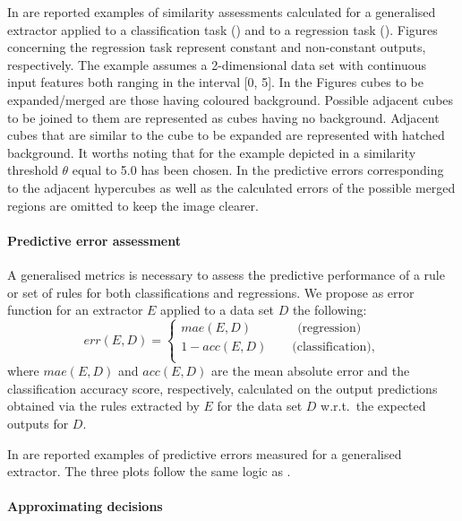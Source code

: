 \documentclass[
]{ceurart}
\begin{document}
In  are reported examples of similarity assessments calculated for a generalised extractor applied to a classification task () and to a regression task ().
%
Figures concerning the regression task represent constant and non-constant outputs, respectively.
%
The example assumes a 2-dimensional data set with continuous input features both ranging in the interval [0, 5].
%
In the Figures cubes to be expanded/merged are those having coloured background.
%
Possible adjacent cubes to be joined to them are represented as cubes having no background.
%
Adjacent cubes that are similar to the cube to be expanded are represented with hatched background.
%
It worths noting that for the example depicted in  a similarity threshold $\theta$ equal to 5.0 has been chosen.
%
In  the predictive errors corresponding to the adjacent hypercubes as well as the calculated errors of the possible merged regions are omitted to keep the image clearer.

\paragraph{Predictive error assessment}

A generalised metrics is necessary to assess the predictive performance of a rule or set of rules for both classifications and regressions.
%
We propose as error function for an extractor $E$ applied to a data set $D$ the following:
%
\begin{equation}
	err(E, D) = 
	\begin{cases}
		mae(E, D) \text{~~~~~~~~~~~(regression)}\\
		1 - acc(E, D) \text{~~~~~~(classification),}\\
	\end{cases}\,\label{eq:error}
\end{equation}
%
where $mae(E, D)$ and $acc(E, D)$ are the mean absolute error and the classification accuracy score, respectively, calculated on the output predictions obtained via the rules extracted by $E$ for the data set $D$ w.r.t.\ the expected outputs for $D$.



In  are reported examples of predictive errors measured for a generalised extractor.
%
The three plots follow the same logic as .

\paragraph{Approximating decisions}
\end{document}
